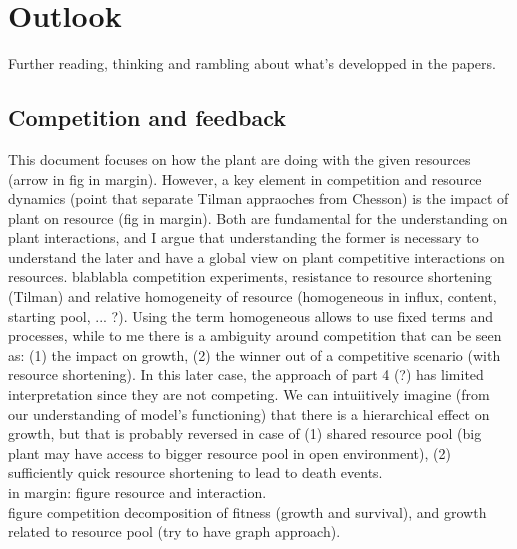 

\chapter{Outlook}

Further reading, thinking and rambling about what's developped in the papers.




\section{Competition and feedback}
This document focuses on how the plant are doing with the given resources (arrow in fig in margin). However, a key element in competition and resource dynamics (point that separate Tilman appraoches from Chesson) is the impact of plant on resource (fig in margin). Both are fundamental for the understanding on plant interactions, and I argue that understanding the former is necessary to understand the later and have a global view on plant competitive interactions on resources. blablabla competition experiments, resistance to resource shortening (Tilman) and relative homogeneity of resource (homogeneous in influx, content, starting pool, ... ?). Using the term homogeneous allows to use fixed terms and processes, while to me there is a ambiguity around competition that can be seen as: (1) the impact on growth, (2) the winner out of a competitive scenario (with resource shortening). In this later case, the approach of part 4 (?) has limited interpretation since they are not competing. We can intuiitively imagine (from our understanding of model's functioning) that  there is a hierarchical effect on growth, but that is probably reversed in case of (1) shared resource pool (big plant may have access to bigger resource pool in open environment), (2) sufficiently quick resource shortening to lead to death events.\\

in margin: figure resource and interaction.\\
figure competition decomposition of fitness (growth and survival), and growth related to resource pool (try to have graph approach).

